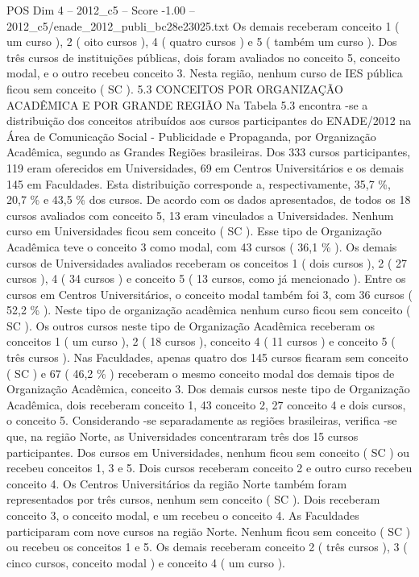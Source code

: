 \begin{textsample}{POS Dim 4 – 2012\_c5 – Score -1.00 – 2012\_c5/enade\_2012\_publi\_bc28e23025.txt}
Os demais receberam conceito 1 ( um curso ), 2 ( oito cursos ), 4 ( quatro cursos ) e 5 ( também um curso ).
Dos três cursos de instituições públicas, dois foram avaliados no conceito 5, conceito modal, e o outro recebeu conceito 3.
Nesta região, nenhum curso de IES pública ficou sem conceito ( SC ). 5.3 CONCEITOS POR ORGANIZAÇÃO ACADÊMICA E POR GRANDE REGIÃO Na Tabela 5.3 encontra -se a distribuição dos conceitos atribuídos aos cursos participantes do ENADE/2012 na Área de Comunicação Social - Publicidade e Propaganda, por Organização Acadêmica, segundo as Grandes Regiões brasileiras.
Dos 333 cursos participantes, 119 eram oferecidos em Universidades, 69 em Centros Universitários e os demais 145 em Faculdades.
Esta distribuição corresponde a, respectivamente, 35,7 \%, 20,7 \% e 43,5 \% dos cursos.
De acordo com os dados apresentados, de todos os 18 cursos avaliados com conceito 5, 13 eram vinculados a Universidades.
Nenhum curso em Universidades ficou sem conceito ( SC ).
Esse tipo de Organização Acadêmica teve o conceito 3 como modal, com 43 cursos ( 36,1 \% ).
Os demais cursos de Universidades avaliados receberam os conceitos 1 ( dois cursos ), 2 ( 27 cursos ), 4 ( 34 cursos ) e conceito 5 ( 13 cursos, como já mencionado ).
Entre os cursos em Centros Universitários, o conceito modal também foi 3, com 36 cursos ( 52,2 \% ).
Neste tipo de organização acadêmica nenhum curso ficou sem conceito ( SC ).
Os outros cursos neste tipo de Organização Acadêmica receberam os conceitos 1 ( um curso ), 2 ( 18 cursos ), conceito 4 ( 11 cursos ) e conceito 5 ( três cursos ).
Nas Faculdades, apenas quatro dos 145 cursos ficaram sem conceito ( SC ) e 67 ( 46,2 \% ) receberam o mesmo conceito modal dos demais tipos de Organização Acadêmica, conceito 3.
Dos demais cursos neste tipo de Organização Acadêmica, dois receberam conceito 1, 43 conceito 2, 27 conceito 4 e dois cursos, o conceito 5.
Considerando -se separadamente as regiões brasileiras, verifica -se que, na região Norte, as Universidades concentraram três dos 15 cursos participantes.
Dos cursos em Universidades, nenhum ficou sem conceito ( SC ) ou recebeu conceitos 1, 3 e 5.
Dois cursos receberam conceito 2 e outro curso recebeu conceito 4.
Os Centros Universitários da região Norte também foram representados por três cursos, nenhum sem conceito ( SC ).
Dois receberam conceito 3, o conceito modal, e um recebeu o conceito 4.
As Faculdades participaram com nove cursos na região Norte.
Nenhum ficou sem conceito ( SC ) ou recebeu os conceitos 1 e 5.
Os demais receberam conceito 2 ( três cursos ), 3 ( cinco cursos, conceito modal ) e conceito 4 ( um curso ).

\end{textsample}
